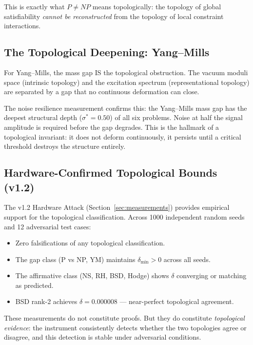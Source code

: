 \documentclass[11pt]{article}
\begin{document}
This is exactly what $P \neq NP$ means topologically: the topology of
global satisfiability \emph{cannot be reconstructed} from the topology of
local constraint interactions.

\subsection{The Topological Deepening: Yang--Mills}
\label{subsec:topo-ym}

For Yang--Mills, the mass gap IS the topological obstruction.
The vacuum moduli space (intrinsic topology) and the excitation spectrum
(representational topology) are separated by a gap that no continuous
deformation can close.

The noise resilience measurement confirms this: the Yang--Mills mass gap
has the deepest structural depth ($\sigma^* = 0.50$) of all six problems.
Noise at half the signal amplitude is required before the gap degrades.
This is the hallmark of a topological invariant: it does not deform
continuously, it persists until a critical threshold destroys the
structure entirely.

\subsection{Hardware-Confirmed Topological Bounds (v1.2)}
\label{subsec:topo-hw}

The v1.2 Hardware Attack (Section~\ref{sec:measurements}) provides
empirical support for the topological classification.  Across 1000
independent random seeds and 12 adversarial test cases:
\begin{itemize}
\item Zero falsifications of any topological classification.
\item The gap class (P vs NP, YM) maintains $\delta_{\min} > 0$
across all seeds.
\item The affirmative class (NS, RH, BSD, Hodge) shows $\delta$
converging or matching as predicted.
\item BSD rank-2 achieves $\delta = 0.000008$ --- near-perfect
topological agreement.
\end{itemize}

These measurements do not constitute proofs.  But they do constitute
\emph{topological evidence}: the instrument consistently detects whether
the two topologies agree or disagree, and this detection is stable under
adversarial conditions.
\end{document}
